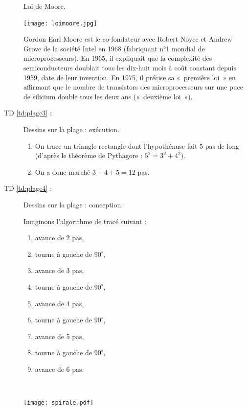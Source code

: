 \begin{description}
	\begin{rem}Loi de Moore.\\
	\begin{minipage}{8cm}
	\centerline{\texttt{[image: loimoore.jpg]}}
	\end{minipage}
	\hfill
	\begin{minipage}{15cm}
	Gordon Earl Moore est le co-fondateur avec Robert Noyce et Andrew Grove de la société Intel en 1968 
	(fabriquant n°1 mondial de microprocesseurs).
	En 1965, il expliquait que la complexité des semiconducteurs 
	doublait tous les dix-huit mois à coût constant depuis 1959, date de leur invention. 
	En 1975, il précise sa «~première loi~» en affirmant que le nombre de transistors des microprocesseurs  
	sur une puce de silicium double tous les deux ans («~deuxième loi~»).
	\end{minipage}
	\end{rem}


\item[TD \ref{td:plage3} :] Dessins sur la plage : exécution.
	\begin{enumerate}
	\item On trace un triangle rectangle dont l'hypothénuse fait 5 pas de long
		(d'après le théorème de Pythagore : $5^2 = 3^2 + 4^2$).
	\item On a donc marché $3 + 4 + 5 = 12$ pas.
	\end{enumerate}
\item[TD \ref{td:plage4} :] Dessins sur la plage : conception.

	\noindent\begin{minipage}{15cm}
	Imaginons l'algorithme de tracé suivant :
	\begin{enumerate}
	\item avance de 2 pas,
	\item tourne à gauche de $90^\circ$,
	\item avance de 3 pas,
	\item tourne à gauche de $90^\circ$,
	\item avance de 4 pas,
	\item tourne à gauche de $90^\circ$,
	\item avance de 5 pas,
	\item tourne à gauche de $90^\circ$,
	\item avance de 6 pas.
	\end{enumerate}
		\end{minipage}
	\hfill
	\begin{minipage}{8cm}
	\begin{fig}\label{fig:spirale}
	\mbox{}\\
	\centerline{\texttt{[image: spirale.pdf]}}
	\end{fig}
	\end{minipage}
	\vspace*{3mm}
	

\end{description}
